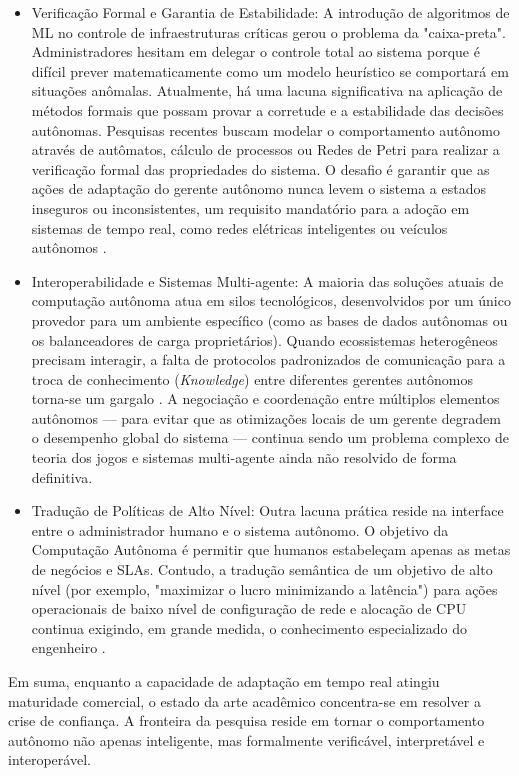 \begin{itemize}
	\item[1] Verificação Formal e Garantia de Estabilidade:
	A introdução de algoritmos de ML no controle de infraestruturas críticas gerou o problema da "caixa-preta". Administradores hesitam em delegar o controle total ao sistema porque é difícil prever matematicamente como um modelo heurístico se comportará em situações anômalas. Atualmente, há uma lacuna significativa na aplicação de métodos formais que possam provar a corretude e a estabilidade das decisões autônomas. Pesquisas recentes buscam modelar o comportamento autônomo através de autômatos, cálculo de processos ou Redes de Petri para realizar a verificação formal das propriedades do sistema. O desafio é garantir que as ações de adaptação do gerente autônomo nunca levem o sistema a estados inseguros ou inconsistentes, um requisito mandatório para a adoção em sistemas de tempo real, como redes elétricas inteligentes ou veículos autônomos \cite{lalanda2013}.
	\item[2] Interoperabilidade e Sistemas Multi-agente:
	A maioria das soluções atuais de computação autônoma atua em silos tecnológicos, desenvolvidos por um único provedor para um ambiente específico (como as bases de dados autônomas ou os balanceadores de carga proprietários). Quando ecossistemas heterogêneos precisam interagir, a falta de protocolos padronizados de comunicação para a troca de conhecimento (\textit{Knowledge}) entre diferentes gerentes autônomos torna-se um gargalo \cite{correa2007}. A negociação e coordenação entre múltiplos elementos autônomos — para evitar que as otimizações locais de um gerente degradem o desempenho global do sistema — continua sendo um problema complexo de teoria dos jogos e sistemas multi-agente ainda não resolvido de forma definitiva.
	\item[3] Tradução de Políticas de Alto Nível:
	Outra lacuna prática reside na interface entre o administrador humano e o sistema autônomo. O objetivo da Computação Autônoma é permitir que humanos estabeleçam apenas as metas de negócios e SLAs. Contudo, a tradução semântica de um objetivo de alto nível (por exemplo, "maximizar o lucro minimizando a latência") para ações operacionais de baixo nível de configuração de rede e alocação de CPU continua exigindo, em grande medida, o conhecimento especializado do engenheiro \cite{kephart2003}.
	\end{itemize}

Em suma, enquanto a capacidade de adaptação em tempo real atingiu maturidade comercial, o estado da arte acadêmico concentra-se em resolver a crise de confiança. A fronteira da pesquisa reside em tornar o comportamento autônomo não apenas inteligente, mas formalmente verificável, interpretável e interoperável.